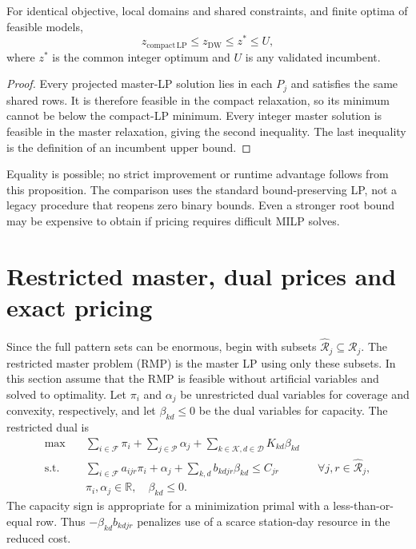 \begin{proposition}
\label{prop:bp_bound_ordering}
For identical objective, local domains and shared constraints, and finite
optima of feasible models,
\begin{equation}
 z_{\mathrm{compact\,LP}}\le z_{\mathrm{DW}}\le z^*\le U,
 \label{eq:bp_bound_order}
\end{equation}
where $z^*$ is the common integer optimum and $U$ is any validated incumbent.
\end{proposition}
\begin{proof}
Every projected master-LP solution lies in each $P_j$ and satisfies the same
shared rows. It is therefore feasible in the compact relaxation, so its
minimum cannot be below the compact-LP minimum. Every integer master solution
is feasible in the master relaxation, giving the second inequality. The last
inequality is the definition of an incumbent upper bound.
\end{proof}

Equality is possible; no strict improvement or runtime advantage follows
from this proposition. The comparison uses the standard bound-preserving LP,
not a legacy procedure that reopens zero binary bounds. Even a stronger root
bound may be expensive to obtain if pricing requires difficult MILP solves.

\section{Restricted master, dual prices and exact pricing}
\label{sec:bp_pricing}

Since the full pattern sets can be enormous, begin with subsets
$\widehat{\mathcal R}_j\subseteq\mathcal R_j$. The restricted master problem
(RMP) is the master LP using only these subsets. In this section assume that
the RMP is feasible without artificial variables and solved to optimality.
Let $\pi_i$ and $\alpha_j$ be unrestricted dual variables for coverage and
convexity, respectively, and let $\beta_{kd}\le0$ be the dual variables for
capacity. The restricted dual is
\begin{align}
 \max\quad &\sum_{i\in\mathcal F}\pi_i+\sum_{j\in\mathcal P}\alpha_j
                  +\sum_{k\in\mathcal K,d\in\mathcal D}K_{kd}\beta_{kd}
                  \label{eq:bp_dual_obj}\\
 \text{s.t.}\quad
 &\sum_{i\in\mathcal F}a_{ijr}\pi_i+\alpha_j
                  +\sum_{k,d}b_{kdjr}\beta_{kd}\le C_{jr}
                  &&\forall j,r\in\widehat{\mathcal R}_j,\\
 &\pi_i,\alpha_j\in\mathbb R,\quad\beta_{kd}\le0.
\end{align}
The capacity sign is appropriate for a minimization primal with a
less-than-or-equal row. Thus $-\beta_{kd}b_{kdjr}$ penalizes use of a scarce
station-day resource in the reduced cost.


